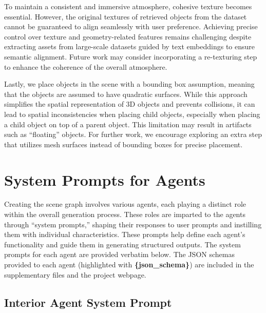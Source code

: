 To maintain a consistent and immersive atmosphere, cohesive texture becomes essential. However, the original textures of retrieved objects from the dataset cannot be guaranteed to align seamlessly with user preference. Achieving precise control over texture and geometry-related features remains challenging despite extracting assets from large-scale datasets guided by text embeddings to ensure semantic alignment. Future work may consider incorporating a re-texturing step to enhance the coherence of the overall atmosphere. 

Lastly, we place objects in the scene with a bounding box assumption, meaning that the objects are assumed to have quadratic surfaces. While this approach simplifies the spatial representation of 3D objects and prevents collisions, it can lead to spatial inconsistencies when placing child objects, especially when placing a child object on top of a parent object. This limitation may result in artifacts such as ``floating'' objects. For further work, we encourage exploring an extra step that utilizes mesh surfaces instead of bounding boxes for precise placement.      

\section{System Prompts for Agents}

Creating the scene graph involves various agents, each playing a distinct role within the overall generation process. These roles are imparted to the agents through ``system prompts,'' shaping their responses to user prompts and instilling them with individual characteristics. These prompts help define each agent's functionality and guide them in generating structured outputs. The system prompts for each agent are provided verbatim below. The JSON schemas provided to each agent (highlighted with \textbf{\{json\_schema\}}) are included in the supplementary files and the project webpage.

\subsection{Interior Agent System Prompt}

